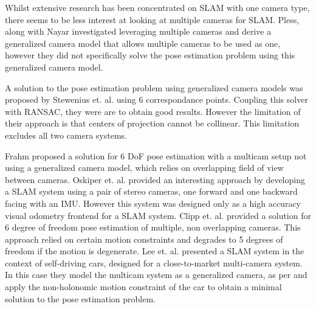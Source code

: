 
Whilst extensive research has been concentrated on SLAM with one camera type, there seems to be less interest at looking at multiple cameras for SLAM.  Pless\cite{pless_03}, along with Nayar\cite{nayar_01} investigated leveraging multiple cameras and derive a generalized camera model that allows multiple cameras to be used as one, however they did not specifically solve the pose estimation problem using this generalized camera model.  

A solution to the pose estimation problem using generalized camera models was proposed by Stewenius et. al. \cite{stewenius_05} using 6 correspondance points.  Coupling this solver with RANSAC, they were are to obtain good results.  However the limitation of their approach is that centers of projection cannot be collinear. This limitation excludes all two camera systems.

Frahm\cite{frahm_04} proposed a solution for 6 DoF pose estimation with a multicam setup not using a generalized camera model, which relies on overlapping field of view between cameras. Oskiper et. al.\cite{oskiper_07} provided an interesting approach by developing a SLAM system using a pair of stereo cameras, one forward and one backward facing with an IMU.  However this system was designed only as a high accuracy visual odometry frontend for a SLAM system.  Clipp et. al.\cite{clipp_09} provided a solution for 6 degree of freedom pose estimation of multiple, non overlapping cameras.  This approach relied on certain motion constraints and degrades to 5 degrees of freedom if the motion is degenerate.  Lee et. al.\cite{lee_13} presented a SLAM system in the context of self-driving cars, designed for a close-to-market multi-camera system.  In this case they model the multicam system as a generalized camera, as per \cite{pless_03} and apply the non-holonomic motion constraint of the car to obtain a minimal solution to the pose estimation problem.
